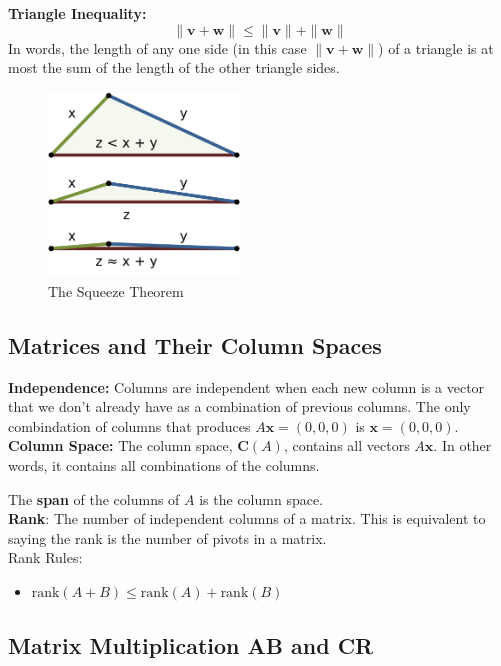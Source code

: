 \documentclass[11pt]{article}
\begin{document}
\textbf{Triangle Inequality:} 
\[\|\boldsymbol{v} + \boldsymbol{w}\| \le \|\boldsymbol{v}\| + \|\boldsymbol{w}\|\]
In words, the length of any one side (in this case $\|\boldsymbol{v}+\boldsymbol{w}\|$) of a 
triangle is at most the sum of the length of the other triangle sides.

\begin{figure}[H] 
	\centering 
	\includegraphics[width=2in]{imgs/triangle_inequality.png}
	\caption{The Squeeze Theorem}
\end{figure}

\subsection{Matrices and Their Column Spaces}

\textbf{Independence:} Columns are independent when each new column is a vector that we don't
already have as a combination of previous columns. The only combindation of columns that produces
$A\boldsymbol{x} = (0,0,0) $ is $ \boldsymbol{x} = (0, 0, 0) $. \\

\textbf{Column Space:} The column space, $\textbf{C}(A)$, contains all vectors 
$A\boldsymbol{x}$. In other words, it contains all combinations of the columns.

The \textbf{span} of the columns of $A$ is the column space. \\

\textbf{Rank}: The number of independent columns of a matrix. This is equivalent to saying the
rank is the number of pivots in a matrix. \\

Rank Rules:
\begin{itemize}
    \item $ \text{rank}(A + B) \le \text{rank}(A) + \text{rank}(B) $
\end{itemize}

\subsection{Matrix Multiplication AB and CR}
\end{document}

